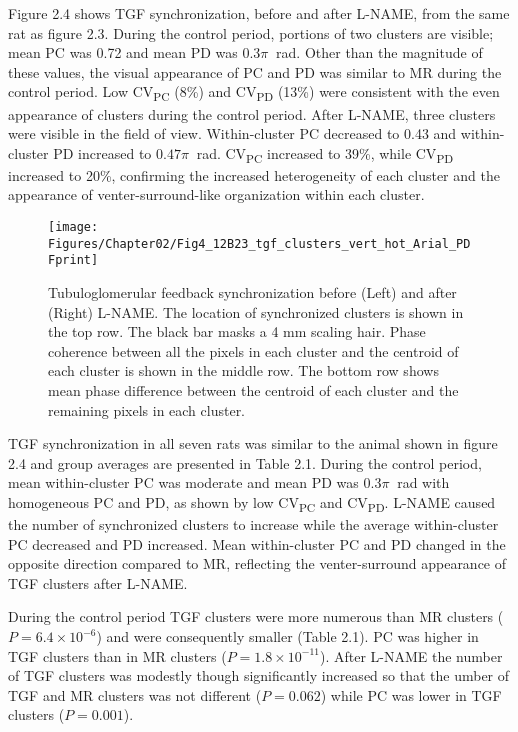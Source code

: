 	Figure 2.4 shows TGF synchronization, before and after L-NAME, from the same rat as figure 2.3. During the control period, portions of two clusters are visible; mean PC was 0.72 and mean PD was $0.3\pi \ $ rad. Other than the magnitude of these values, the visual appearance of PC and PD was similar to MR during the control period. Low CV\textsubscript{PC} (8\%) and CV\textsubscript{PD} (13\%) were consistent with the even appearance of clusters during the control period. After L-NAME, three clusters were visible in the field of view. Within-cluster PC decreased to 0.43 and within-cluster PD increased to $0.47\pi \ $ rad. CV\textsubscript{PC} increased to 39\%, while CV\textsubscript{PD} increased to 20\%, confirming the increased heterogeneity of each cluster and the appearance of venter-surround-like organization within each cluster.
	
\begin{figure}[H]
\begin{center}
\texttt{[image: Figures/Chapter02/Fig4\_12B23\_tgf\_clusters\_vert\_hot\_Arial\_PDFprint]}
\caption[Tubuloglomerular feedback synchronization before and after L-NAME]{Tubuloglomerular feedback synchronization before (Left) and after (Right) L-NAME. The location of synchronized clusters is shown in the top row. The black bar masks a 4 mm scaling hair. Phase coherence between all the pixels in each cluster and the centroid of each cluster is shown in the middle row. The bottom row shows mean phase difference between the centroid of each cluster and the remaining pixels in each cluster.}
\end{center}
\end{figure}

	TGF synchronization in all seven rats was similar to the animal shown in figure 2.4 and group averages are presented in Table 2.1. During the control period, mean within-cluster PC was moderate and mean PD was $0.3\pi \ $ rad with homogeneous PC and PD, as shown by low CV\textsubscript{PC} and CV\textsubscript{PD}. L-NAME caused the number of synchronized clusters to increase while the average within-cluster PC decreased and PD increased. Mean within-cluster PC and PD changed in the opposite direction compared to MR, reflecting the venter-surround appearance of TGF clusters after L-NAME.
	
	During the control period TGF clusters were more numerous than MR clusters ($P=6.4\times 10^{-6}$) and were consequently smaller (Table 2.1). PC was higher in TGF clusters than in MR clusters ($P=1.8\times 10^{-11}$). After L-NAME the number of TGF clusters was modestly though significantly increased so that the umber of TGF and MR clusters was not different ($P=0.062$) while PC was lower in TGF clusters ($P=0.001$). 
	
